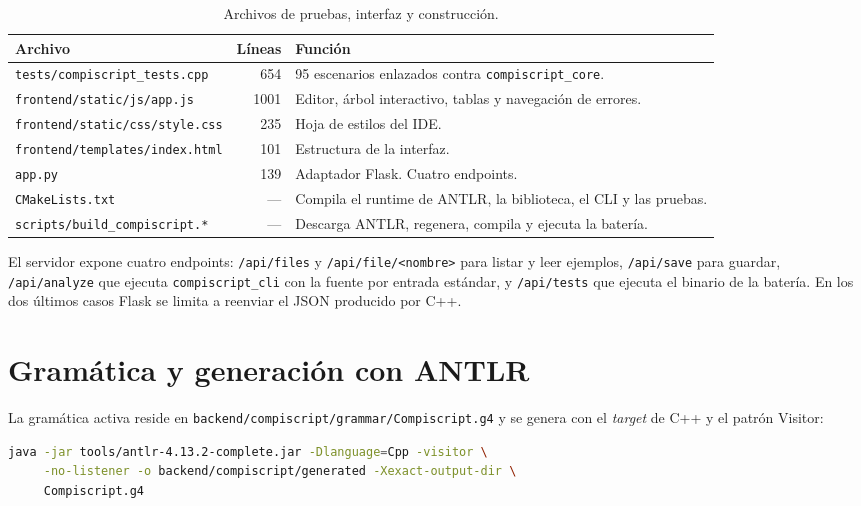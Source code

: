 \documentclass[11pt,a4paper]{article}
\begin{document}
\begin{table}[H]
\centering
\small
\begin{tabular}{@{}L{6.3cm}rL{6.3cm}@{}}
\toprule
\textbf{Archivo} & \textbf{Líneas} & \textbf{Función} \\
\midrule
\texttt{tests/compiscript\_tests.cpp} & 654 &
95 escenarios enlazados contra \texttt{compiscript\_core}. \\
\texttt{frontend/static/js/app.js} & 1001 &
Editor, árbol interactivo, tablas y navegación de errores. \\
\texttt{frontend/static/css/style.css} & 235 & Hoja de estilos del IDE. \\
\texttt{frontend/templates/index.html} & 101 & Estructura de la interfaz. \\
\texttt{app.py} & 139 & Adaptador Flask. Cuatro endpoints. \\
\texttt{CMakeLists.txt} & --- &
Compila el runtime de ANTLR, la biblioteca, el CLI y las pruebas. \\
\texttt{scripts/build\_compiscript.*} & --- &
Descarga ANTLR, regenera, compila y ejecuta la batería. \\
\bottomrule
\end{tabular}
\caption{Archivos de pruebas, interfaz y construcción.}
\end{table}

El servidor expone cuatro endpoints: \texttt{/api/files} y
\texttt{/api/file/<nombre>} para listar y leer ejemplos, \texttt{/api/save}
para guardar, \texttt{/api/analyze} que ejecuta \texttt{compiscript\_cli} con la
fuente por entrada estándar, y \texttt{/api/tests} que ejecuta el binario de la
batería. En los dos últimos casos Flask se limita a reenviar el JSON producido
por C++.

\section{Gramática y generación con ANTLR}

La gramática activa reside en
\texttt{backend/compiscript/grammar/Compiscript.g4} y se genera con el
\emph{target} de C++ y el patrón Visitor:

\begin{lstlisting}[language=bash,caption={Generación del lexer, parser y Visitor.}]
java -jar tools/antlr-4.13.2-complete.jar -Dlanguage=Cpp -visitor \
     -no-listener -o backend/compiscript/generated -Xexact-output-dir \
     Compiscript.g4
\end{lstlisting}
\end{document}
